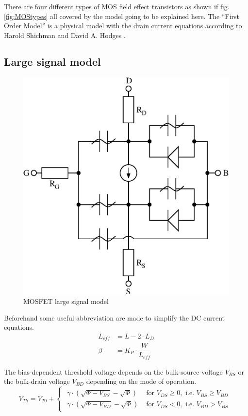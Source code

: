 \documentclass[10pt]{report}
\begin{document}
There are four different types of MOS field effect transistors as
shown if fig. \ref{fig:MOStypes} all covered by the model going to be
explained here.  The ``First Order Model'' is a physical model with
the drain current equations according to Harold Shichman and David
A. Hodges \cite{Shichman}.

\subsection{Large signal model}

\begin{figure}[ht]
\begin{center}
\includegraphics[width=0.6\linewidth]{mosfet}
\end{center}
\caption{MOSFET large signal model}
\label{fig:mosfet}
\end{figure}
\FloatBarrier

Beforehand some useful abbreviation are made to simplify the DC
current equations.
\begin{align}
L_{eff} &= L - 2\cdot L_D\\
\beta &= K_P\cdot \dfrac{W}{L_{eff}}
\end{align}

The bias-dependent threshold voltage depends on the bulk-source
voltage $V_{BS}$ or the bulk-drain voltage $V_{BD}$ depending on the
mode of operation.
\begin{equation}
V_{Th} = V_{T0} +
\begin{cases}
\begin{array}{ll}
\gamma\cdot\left(\sqrt{\Phi - V_{BS}} - \sqrt{\Phi}\right) & \textrm{ for } V_{DS} \ge 0, \textrm{ i.e. } V_{BS} \ge V_{BD}\\
\gamma\cdot\left(\sqrt{\Phi - V_{BD}} - \sqrt{\Phi}\right) & \textrm{ for } V_{DS} < 0, \textrm{ i.e. } V_{BD} > V_{BS}
\end{array}
\end{cases}
\end{equation}
\end{document}
